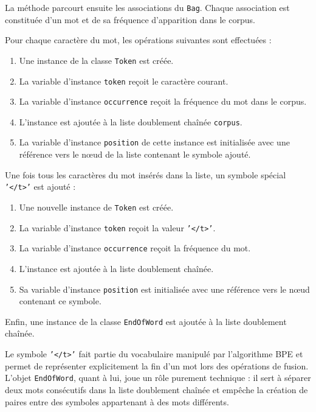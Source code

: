 \documentclass[12pt,a4paper]{report}
\begin{document}
	La méthode parcourt ensuite les associations du \texttt{Bag}. Chaque association est constituée d'un mot et de sa fréquence d'apparition dans le corpus.
	
	Pour chaque caractère du mot, les opérations suivantes sont effectuées :
	
	\begin{enumerate}
		\item Une instance de la classe \texttt{Token} est créée.
		
		\item La variable d'instance \texttt{token} reçoit le caractère courant.
		
		\item La variable d'instance \texttt{occurrence} reçoit la fréquence du mot dans le corpus.
		
		\item L'instance est ajoutée à la liste doublement chaînée \texttt{corpus}.
		
		\item La variable d'instance \texttt{position} de cette instance est initialisée avec une référence vers le nœud de la liste contenant le symbole ajouté.
	\end{enumerate}
	
	Une fois tous les caractères du mot insérés dans la liste, un symbole spécial \texttt{'</t>'} est ajouté :
	
	\begin{enumerate}
		\item Une nouvelle instance de \texttt{Token} est créée.
		
		\item La variable d'instance \texttt{token} reçoit la valeur \texttt{'</t>'}.
		
		\item La variable d'instance \texttt{occurrence} reçoit la fréquence du mot.
		
		\item L'instance est ajoutée à la liste doublement chaînée.
		
		\item Sa variable d'instance \texttt{position} est initialisée avec une référence vers le nœud contenant ce symbole.
	\end{enumerate}
	
	Enfin, une instance de la classe \texttt{EndOfWord} est ajoutée à la liste doublement chaînée.
	
	Le symbole \texttt{'</t>'} fait partie du vocabulaire manipulé par l'algorithme BPE et permet de représenter explicitement la fin d'un mot lors des opérations de fusion. L'objet \texttt{EndOfWord}, quant à lui, joue un rôle purement technique : il sert à séparer deux mots consécutifs dans la liste doublement chaînée et empêche la création de paires entre des symboles appartenant à des mots différents.
	
\end{document}
